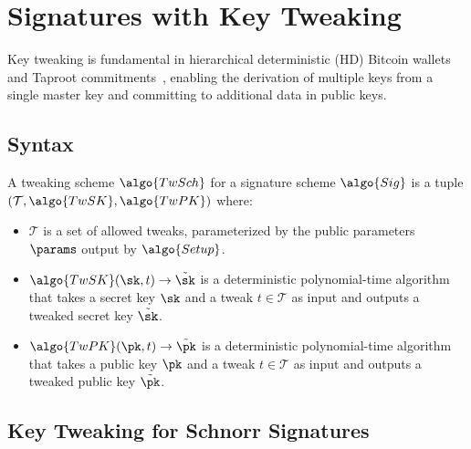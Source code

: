 \section{Signatures with Key Tweaking}\label{sec:signatures-key-tweaking}

Key tweaking is fundamental in hierarchical deterministic (HD) Bitcoin wallets~\cite{add:bip-hdwallets} and Taproot commitments~\cite{add:bip-taproot}, enabling the derivation of multiple keys from a single master key and committing to additional data in public keys.

\subsection{Syntax}

\begin{definition}
  A tweaking scheme $\algo{TwSch}$ for a signature scheme $\algo{Sig}$ is a tuple $(\mathcal{T}, \algo{TwSK}, \algo{TwPK})$ where:
  \begin{itemize}
    \item $\mathcal{T}$ is a set of allowed tweaks, parameterized by the public parameters $\params$ output by $\algo{Setup}$.
    \item $\algo{TwSK}(\sk, t) \rightarrow \tilde{\sk}$ is a deterministic polynomial-time algorithm that takes a secret key $\sk$ and a tweak $t \in \mathcal{T}$ as input and outputs a tweaked secret key $\tilde{\sk}$.
    \item $\algo{TwPK}(\pk, t) \rightarrow \tilde{\pk}$ is a deterministic polynomial-time algorithm that takes a public key $\pk$ and a tweak $t \in \mathcal{T}$ as input and outputs a tweaked public key $\tilde{\pk}$.
  \end{itemize}
\end{definition}

\subsection{Key Tweaking for Schnorr Signatures}

